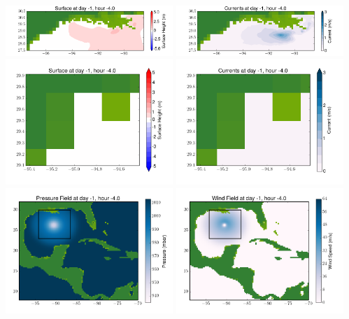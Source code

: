 \documentclass[11pt]{article}
\begin{document}
\includegraphics[width=0.475\textwidth]{frame0044fig4.png}
\vskip 10pt 
\includegraphics[width=0.475\textwidth]{frame0044fig5.png}
\includegraphics[width=0.475\textwidth]{frame0044fig6.png}
\vskip 10pt 
\includegraphics[width=0.475\textwidth]{frame0044fig7.png}
\includegraphics[width=0.475\textwidth]{frame0044fig8.png}
\vskip 10pt 
\includegraphics[width=0.475\textwidth]{frame0044fig9.png}
\end{document}
